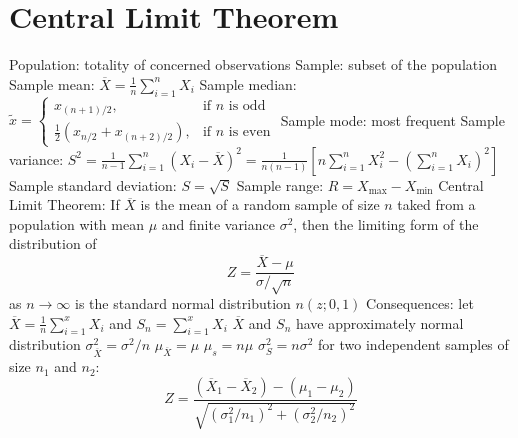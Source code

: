 \documentclass[a4paper,11pt]{article}
\begin{document}
	\section{Central Limit Theorem}
	\begin{outline}[enumerate]
		\1 Population: totality of concerned observations
		\1 Sample: subset of the population
			\2 Sample mean: $\overline{X} = \frac{1}{n}\sum_{i = 1}^{n} X_{i}$	
			\2 Sample median: $\tilde{x} = \left\{\begin{array}{ll}
				x_{\left(n + 1\right)/2}, & \text{if $n$ is odd} \\
				\frac{1}{2}\left(x_{n/2} + x_{\left(n + 2\right)/2}\right), & \text{if $n$ is even}
			\end{array} \right.$ 
			\2 Sample mode: most frequent
			\2 Sample variance: $S^2 = \frac{1}{n - 1}\sum_{i = 1}^{n} \left(X_{i} - \overline{X}\right)^{2} = \frac{1}{n\left(n - 1\right)} \left[n\sum_{i = 1}^{n}X_{i}^{2} - \left(\sum_{i = 1}^{n} X_{i}\right)^2\right]$
			\2 Sample standard deviation: $S = \sqrt{S}$
			\2 Sample range: $R = X_{\text{max}} - X_{\text{min}}$
		\1 Central Limit Theorem: If $\overline{X}$ is the mean of a random sample of size $n$ taked from a population with mean $\mu$ and finite variance $\sigma^{2}$, then the limiting form of the distribution of 
		\begin{equation}
			Z = \frac{\overline{X} - \mu}{\sigma / \sqrt{n}}
		\end{equation}	
		as $n \to \infty$ is the standard normal distribution $n\left(z; 0, 1\right)$
		\1 Consequences:
			\2 let $\overline{X} = \frac{1}{n}\sum_{i = 1}^{x} X_{i}$ and $S_{n} = \sum_{i = 1}^{x} X_{i}$
			\2 $\overline{X}$ and $S_{n}$ have approximately normal distribution
			\2 $\sigma_{\overline{X}}^{2} = \sigma^{2}/n$
			\2 $\mu_{\overline{X}} = \mu$
			\2 $\mu_{s} = n\mu$
			\2 $\sigma_{S}^{2} = n\sigma^2$
		\1 for two independent samples of size $n_{1}$ and $n_{2}$:
		\begin{equation}
			Z = \frac{\left(\overline{X}_{1} - \overline{X}_{2}\right) - \left(\mu_{1} - \mu_{2}\right)}{\sqrt{\left(\sigma_{1}^{2} / n_{1}\right)^{2} + \left(\sigma_{2}^{2} / n_{2}\right)^{2}}}
		\end{equation}	
	\end{outline}
\end{document}
